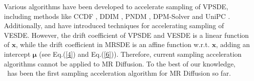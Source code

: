 Various algorithms have been developed to accelerate sampling of VPSDE, including methods like CCDF \citep{chung2022come}, DDIM \citep{song2020ddim}, PNDM \citep{liu2022pndm}, DPM-Solver \citep{lu2022dpmsolver} and UniPC \citep{zhao2024unipc}. Additionally, \cite{karras2022elucidating} and \cite{zhou2024amed} have introduced techniques for accelerating sampling of VESDE. However, the drift coefficient of VPSDE and VESDE is a linear function of $\boldsymbol{x}$, while the drift coefficient in MRSDE is an affine function w.r.t. $\boldsymbol{x}$, adding an intercept $\boldsymbol{\mu}$ (see Eq.(\ref{4}) and Eq.(\ref{6})). Therefore, current sampling acceleration algorithms cannot be applied to MR Diffusion. To the best of our knowledge, \ourmethod~has been the first sampling acceleration algorithm for MR Diffusion so far.